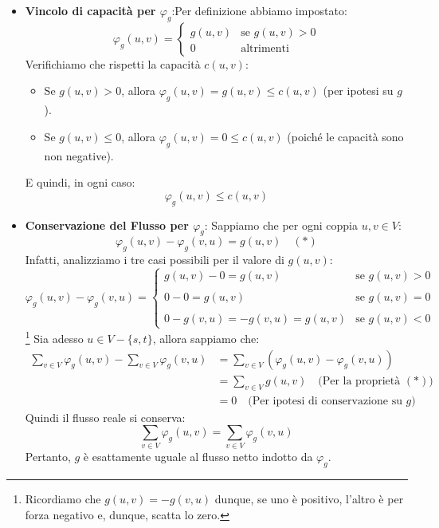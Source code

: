 \begin{itemize}
    \item \textbf{Vincolo di capacità per $\varphi_g$}:Per definizione abbiamo impostato:
    \[
        \varphi_g(u, v) = 
        \begin{cases} 
        g(u, v) & \text{se } g(u, v) > 0 \\
        0 & \text{altrimenti}
        \end{cases}
    \]
    Verifichiamo che rispetti la capacità $c(u,v)$:
    \begin{itemize}
        \item Se $g(u, v) > 0$, allora $\varphi_g(u, v) = g(u, v) \le c(u, v)$ (per ipotesi su $g$).
        \item Se $g(u, v) \le 0$, allora $\varphi_g(u, v) = 0 \le c(u, v)$ (poiché le capacità sono non negative).
    \end{itemize}
    E quindi, in ogni caso:
    \[\varphi_g(u, v) \le c(u, v)\]
    \item \textbf{Conservazione del Flusso per $\varphi_g$}: Sappiamo che per ogni coppia $u, v \in V$:
    \[\varphi_g(u, v) - \varphi_g(v, u) = g(u, v) \quad (*)\]
    Infatti, analizziamo i tre casi possibili per il valore di $g(u,v)$:
    \[\varphi_g(u, v) - \varphi_g(v, u) = 
    \begin{cases} 
        g(u, v) - 0 = g(u, v) & \text{se } g(u, v) > 0 \\
        \\
        0 - 0 = g(u, v) & \text{se } g(u, v) = 0 \\
        \\
        0 - g(v, u) = -g(v, u) = g(u, v) & \text{se } g(u, v) < 0
    \end{cases}
    \]\footnote{Ricordiamo che $g(u, v) = - g(v, u)$ dunque, se uno è positivo, l'altro è per forza negativo e, dunque, scatta lo zero.}
    Sia adesso $u \in V - \{s,t\}$, allora sappiamo che:
    \begin{align*}
        \sum_{v \in V} \varphi_g(u, v) - \sum_{v \in V} \varphi_g(v, u) &= \sum_{v \in V} \left( \varphi_g(u, v) - \varphi_g(v, u) \right) \\
        &= \sum_{v \in V} g(u, v) \quad \text{(Per la proprietà $(*)$)} \\
        &= 0 \quad \text{(Per ipotesi di conservazione su $g$)}
    \end{align*}
    Quindi il flusso reale si conserva:
    \[\sum_{v \in V} \varphi_g(u, v) = \sum_{v \in V} \varphi_g(v, u)\]
    Pertanto, $g$ è esattamente uguale al flusso netto indotto da $\varphi_g$.
\end{itemize}


